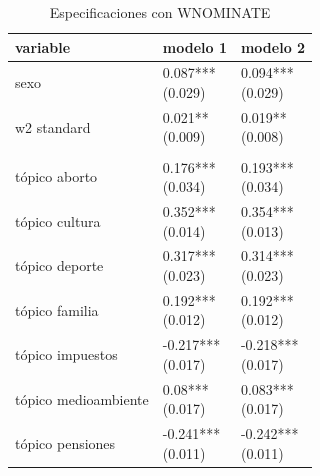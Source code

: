 \documentclass[
  12pt,
]{article}
\begin{document}
\begin{table}[H]

\caption{\label{tab:imprimir_regresion_nominate}Especificaciones con WNOMINATE}
\centering
\fontsize{10}{12}\selectfont
\begin{threeparttable}
\begin{tabular}[t]{lll}
\toprule
variable & modelo 1 & modelo 2\\
\midrule
sexo & \makecell[l]{0.087***\\ (0.029)} & \makecell[l]{0.094***\\ (0.029)}\\
w2 standard & \makecell[l]{0.021**\\ (0.009)} & \makecell[l]{0.019**\\ (0.008)}\\
\addlinespace[0.3em]
\multicolumn{3}{l}{\textbf{Tópicos}}\\
\hspace{1em}tópico aborto & \makecell[l]{0.176***\\ (0.034)} & \makecell[l]{0.193***\\ (0.034)}\\
\hspace{1em}tópico cultura & \makecell[l]{0.352***\\ (0.014)} & \makecell[l]{0.354***\\ (0.013)}\\
\hspace{1em}tópico deporte & \makecell[l]{0.317***\\ (0.023)} & \makecell[l]{0.314***\\ (0.023)}\\
\hspace{1em}tópico familia & \makecell[l]{0.192***\\ (0.012)} & \makecell[l]{0.192***\\ (0.012)}\\
\hspace{1em}tópico impuestos & \makecell[l]{-0.217***\\ (0.017)} & \makecell[l]{-0.218***\\ (0.017)}\\
\hspace{1em}tópico medioambiente & \makecell[l]{0.08***\\ (0.017)} & \makecell[l]{0.083***\\ (0.017)}\\
\hspace{1em}tópico pensiones & \makecell[l]{-0.241***\\ (0.011)} & \makecell[l]{-0.242***\\ (0.011)}\\

\end{tabular}
\end{threeparttable}
\end{table}
\end{document}
